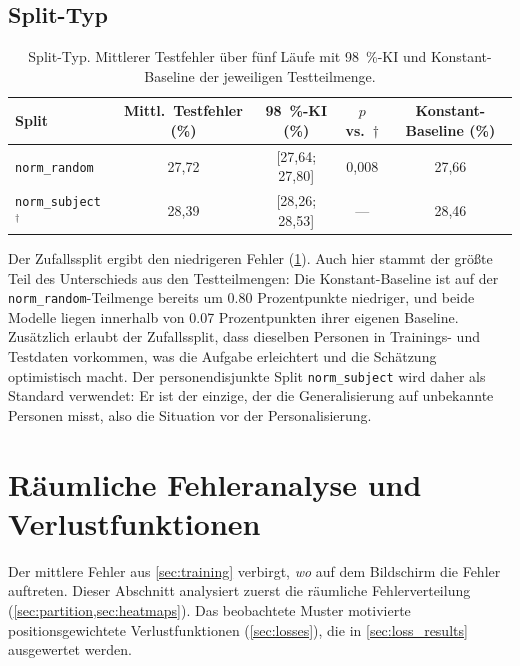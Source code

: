 \documentclass[
  11pt,
  a4paper,
  oneside,
  DIV=12,
  BCOR=8mm,
  parskip=half,
  headings=normal,
  bibliography=totoc,
  listof=totoc
]{scrreprt}
\newcommand{\code}[1]{\texttt{#1}}
\newcommand{\sel}{\ensuremath{^{\dagger}}}
\begin{document}
\subsection{Split-Typ}
\label{sec:split}

\begin{table}[htbp]
  \centering
  \caption{Split-Typ. Mittlerer Testfehler über fünf Läufe mit
           \SI{98}{\percent}-KI und Konstant-Baseline der jeweiligen
           Testteilmenge.}
  \label{tab:split}
  \small
  \begin{tabular}{lcccc}
    \toprule
    Split & Mittl.\ Testfehler (\%) & \SI{98}{\percent}-KI (\%) & $p$ vs.\ $\dagger$ & Konstant-Baseline (\%) \\
    \midrule
    \code{norm\_random}           & 27,72 & [27,64; 27,80] & 0,008 & 27,66 \\
    \code{norm\_subject}\sel{}    & 28,39 & [28,26; 28,53] & ---   & 28,46 \\
    \bottomrule
  \end{tabular}
\end{table}

Der Zufallssplit ergibt den niedrigeren Fehler (\cref{tab:split}). Auch hier
stammt der größte Teil des Unterschieds aus den Testteilmengen: Die
Konstant-Baseline ist auf der \code{norm\_random}-Teilmenge bereits um
\num{0,80} Prozentpunkte niedriger, und beide Modelle liegen innerhalb von
\num{0,07} Prozentpunkten ihrer eigenen Baseline. Zusätzlich erlaubt der
Zufallssplit, dass dieselben Personen in Trainings- und Testdaten vorkommen,
was die Aufgabe erleichtert und die Schätzung optimistisch macht. Der
personendisjunkte Split \code{norm\_subject} wird daher als Standard
verwendet: Er ist der einzige, der die Generalisierung auf unbekannte
Personen misst, also die Situation vor der Personalisierung.

\section{Räumliche Fehleranalyse und Verlustfunktionen}
\label{sec:spatial}

Der mittlere Fehler aus \cref{sec:training} verbirgt, \emph{wo} auf dem
Bildschirm die Fehler auftreten. Dieser Abschnitt analysiert zuerst die
räumliche Fehlerverteilung (\cref{sec:partition,sec:heatmaps}). Das
beobachtete Muster motivierte positionsgewichtete Verlustfunktionen
(\cref{sec:losses}), die in \cref{sec:loss_results} ausgewertet werden.
\end{document}
